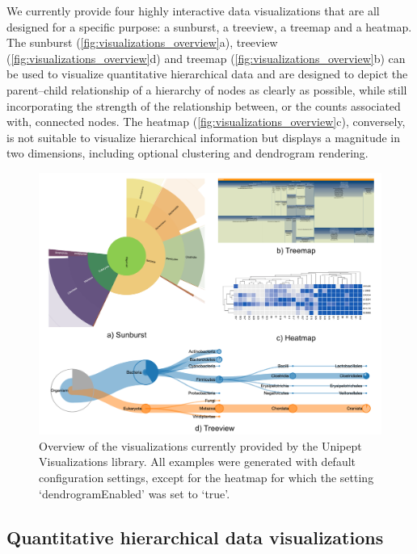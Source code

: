 We currently provide four highly interactive data visualizations that
are all designed for a specific purpose: a sunburst, a treeview, a
treemap and a heatmap. The sunburst
(\autoref{fig:visualizations_overview}a), treeview
(\autoref{fig:visualizations_overview}d) and treemap
(\autoref{fig:visualizations_overview}b) can be used to visualize
quantitative hierarchical data and are designed to depict the
parent--child relationship of a hierarchy of nodes as clearly as
possible, while still incorporating the strength of the relationship
between, or the counts associated with, connected nodes. The heatmap
(\autoref{fig:visualizations_overview}c), conversely, is not suitable to
visualize hierarchical information but displays a magnitude in two
dimensions, including optional clustering and dendrogram rendering.

\begin{figure}
\centering
\includegraphics{resources/figures/chapter6_visualizations_overview.png}
\caption{Overview of the visualizations currently provided by the
Unipept Visualizations library. All examples were generated with default
configuration settings, except for the heatmap for which the setting
`dendrogramEnabled' was set to
`true'.\label{fig:visualizations_overview}}
\end{figure}

\hypertarget{quantitative-hierarchical-data-visualizations}{%
\subsection{Quantitative hierarchical data
visualizations}\label{quantitative-hierarchical-data-visualizations}}

